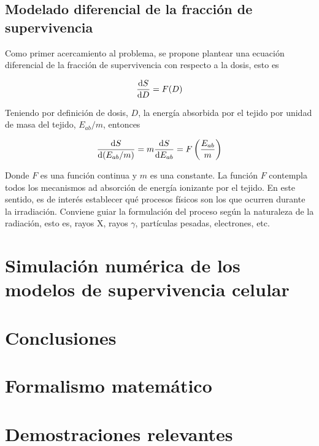 \documentclass[12pt,letterpaper, oneside]{book}
\begin{document}
	\section{Modelado diferencial de la fracción de supervivencia}
	Como primer acercamiento al problema, se propone plantear una ecuación diferencial de la fracción de supervivencia con respecto a la dosis, esto es
	
	$$\dv{S}{D}=F(D)$$
	
	Teniendo por definición de dosis, $D$, la energía absorbida por el tejido por unidad de masa del tejido, $E_{ab}/m$, entonces
	
	$$\dv{S}{(E_{ab}/m)}=m\dv{S}{E_{ab}}=F\left(\frac{E_{ab}}{m}\right)$$
	
	Donde $F$ es una función continua y $m$ es una constante. La función $F$ contempla todos los mecanismos ad absorción de energía ionizante por el tejido. En este sentido, es de interés establecer qué procesos físicos son los que ocurren durante la irradiación. Conviene guiar la formulación del proceso según la naturaleza de la radiación, esto es, rayos X, rayos $\gamma$, partículas pesadas, electrones, etc.
	
	\chapter{Simulación numérica de los modelos de supervivencia celular}
		
	\chapter{Conclusiones}
	
	\appendix
	\clearpage
	\addappheadtotoc
	\appendixpage
	
	\chapter{Formalismo matemático}
	
	\chapter{Demostraciones relevantes}

	
	
	
\end{document}
